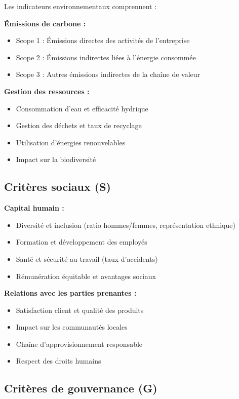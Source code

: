 Les indicateurs environnementaux comprennent :

\textbf{Émissions de carbone :}
\begin{itemize}
\item Scope 1 : Émissions directes des activités de l'entreprise
\item Scope 2 : Émissions indirectes liées à l'énergie consommée
\item Scope 3 : Autres émissions indirectes de la chaîne de valeur
\end{itemize}

\textbf{Gestion des ressources :}
\begin{itemize}
\item Consommation d'eau et efficacité hydrique
\item Gestion des déchets et taux de recyclage
\item Utilisation d'énergies renouvelables
\item Impact sur la biodiversité
\end{itemize}

\subsection{Critères sociaux (S)}

\textbf{Capital humain :}
\begin{itemize}
\item Diversité et inclusion (ratio hommes/femmes, représentation ethnique)
\item Formation et développement des employés
\item Santé et sécurité au travail (taux d'accidents)
\item Rémunération équitable et avantages sociaux
\end{itemize}

\textbf{Relations avec les parties prenantes :}
\begin{itemize}
\item Satisfaction client et qualité des produits
\item Impact sur les communautés locales
\item Chaîne d'approvisionnement responsable
\item Respect des droits humains
\end{itemize}

\subsection{Critères de gouvernance (G)}

